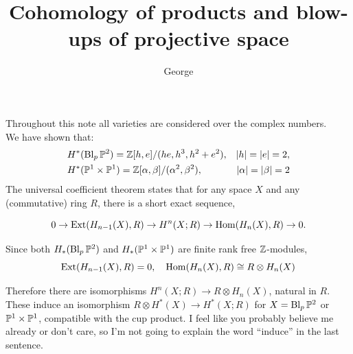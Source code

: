 \documentclass[12pt,a4paper]{article}
\title{Cohomology of products and blow-ups of projective space}
\author{George}
\newcommand{\Bl}{\operatorname{Bl}}
\begin{document}
\maketitle

Throughout this note all varieties are considered over the complex numbers.\\

We have shown that: 
\begin{align}
    &H^*(\Bl_p \P^2) = \Z[h, e]/(he,h^3,h^2+e^2), &|h|=|e|=2, \\
    &H^*(\P^1 \times \P^1) = \Z[\alpha,\beta]/(\alpha^2,\beta^2), &|\alpha|=|\beta|=2
\end{align}
 The universal coefficient theorem states that for any space $X$ and any (commutative) ring $R$, there is a short exact sequence,


    \begin{equation}
        0 \to \Ext(H_{n-1}(X),R) \to H^n(X;R) \to \Hom(H_n(X),R) \to 0.
    \end{equation}

Since both $H_*(\Bl_p \P^2)$ and $H_*(\P^1 \times \P^1)$ are finite rank free $\Z$-modules, 
\begin{equation}
    \Ext(H_{n-1}(X),R) = 0,\quad \Hom(H_n(X),R) \cong R \otimes H_n(X)
\end{equation}

Therefore there are isomorphisms $H^n(X;R) \to R \otimes H_n(X)$, natural in $R$. These induce an isomorphism $R \otimes H^*(X) \to H^*(X;R)$ for $X = \Bl_p \P^2$ or $\P^1 \times \P^1$, compatible with the cup product. I feel like you probably believe me already or don't care, so I'm not going to explain the word ``induce'' in the last sentence.
\end{document}
